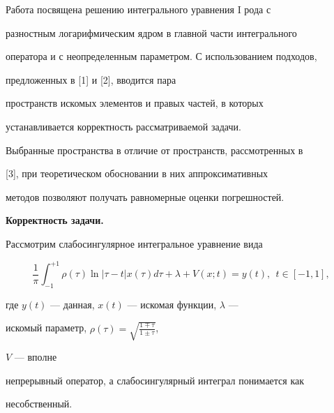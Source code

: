 \maketitle


\label{begin}











Работа посвящена решению интегрального уравнения I рода с


разностным логарифмическим ядром в главной части интегрального


оператора и с неопределенным параметром. С использованием подходов,


предложенных в [1] и [2], вводится пара


пространств искомых элементов и правых частей, в которых


устанавливается корректность рассматриваемой задачи.





Выбранные пространства в отличие от пространств, рассмотренных в


[3], при теоретическом обосновании в них аппроксимативных


методов позволяют получать равномерные оценки погрешностей.


\medskip





{\bf Корректность задачи.}


Рассмотрим слабосингулярное интегральное уравнение вида


\begin{equation}


\frac{1}{\pi}\int_{-1}^{+1}\rho(\tau)\ln|\tau-t|x(\tau)d\tau


+ \lambda + V(x;t) = y(t),\ \ t\in [-1,1],


\end{equation}


где $y(t)$ --- данная, $x(t)$ --- искомая функции, $\lambda$ ---


искомый параметр, $\rho(\tau)=\sqrt{\frac{1\mp\tau}{1\pm\tau}}$,


$V$ --- вполне


непрерывный оператор, а слабосингулярный интеграл понимается как


несобственный.






